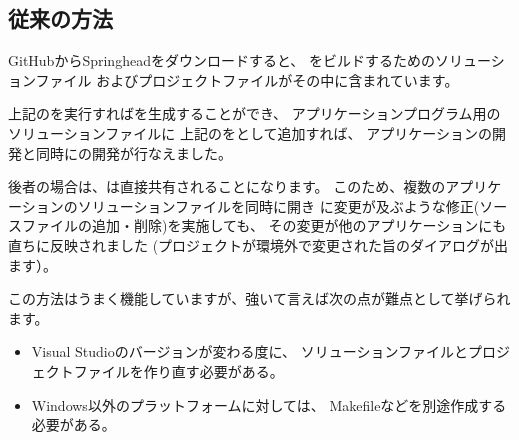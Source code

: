 \subsection{従来の方法}
\label{subsec:ConventionalMethod}

\noindent
GitHubからSpringheadをダウンロードすると、
\SprLib をビルドするためのソリューションファイル
およびプロジェクトファイルがその中に含まれています。

\medskip
\begin{narrow}
    \begin{narrow}[20pt]\begin{minipage}{\textwidth}
	{\footnotesize{}}
	\medskip
  \end{minipage}\end{narrow}
\end{narrow}

\noindent
上記の\SolutionFile を実行すれば\SprLib を生成することができ、
アプリケーションプログラム用のソリューションファイルに
上記の\ProjectFile をとして追加すれば、
アプリケーションの開発と同時に\SprLib の開発が行なえました。

後者の場合は、\ProjectFile は直接共有されることになります。
このため、複数のアプリケーションのソリューションファイルを同時に開き
\ProjectFile に変更が及ぶような修正(ソースファイルの追加・削除)を実施しても、
その変更が他のアプリケーションにも直ちに反映されました
(プロジェクトが環境外で変更された旨のダイアログが出ます）。

\medskip
\noindent
この方法はうまく機能していますが、強いて言えば次の点が難点として挙げられます。

\begin{itemize}
  \item	Visual Studioのバージョンが変わる度に、
	ソリューションファイルとプロジェクトファイルを作り直す必要がある。
  \item	Windows以外のプラットフォームに対しては、
	Makefileなどを別途作成する必要がある。
\end{itemize}

